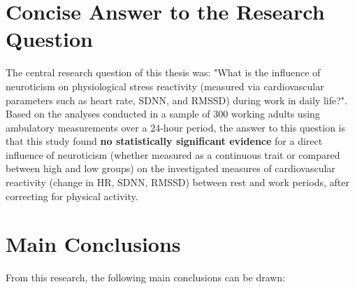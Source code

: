 \documentclass[11pt, a4paper]{report}
\begin{document}
\section{Concise Answer to the Research Question}
\label{sec:conclusion_answer_main} %

The central research question of this thesis was: "What is the influence of neuroticism on physiological stress reactivity (measured via cardiovascular parameters such as heart rate, SDNN, and RMSSD) during work in daily life?". Based on the analyses conducted in a sample of 300 working adults using ambulatory measurements over a 24-hour period, the answer to this question is that this study found \textbf{no statistically significant evidence} for a direct influence of neuroticism (whether measured as a continuous trait or compared between high and low groups) on the investigated measures of cardiovascular reactivity (change in HR, SDNN, RMSSD) between rest and work periods, after correcting for physical activity.

\section{Main Conclusions}
\label{sec:conclusion_main_points} %

From this research, the following main conclusions can be drawn:
\end{document}
